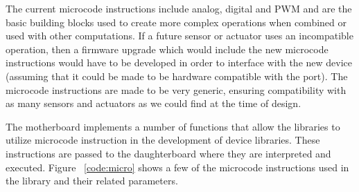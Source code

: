  The current microcode instructions include analog, digital and PWM and are the basic building blocks used to create more complex operations when combined or used with other computations. If a future sensor or actuator uses an incompatible operation, then a firmware upgrade which would include the new microcode instructions would have to be developed in order to interface with the new device (assuming that it could be made to be hardware compatible with the port). The microcode instructions are made to be very generic, ensuring compatibility with as many sensors and actuators as we could find at the time of design.

	The motherboard implements a number of functions that allow the libraries to utilize microcode instruction in the development of device libraries. These instructions are passed to the daughterboard where they are interpreted and executed. Figure ~\ref{code:micro} shows a few of the microcode instructions used in the \xten library and their related parameters.
	
